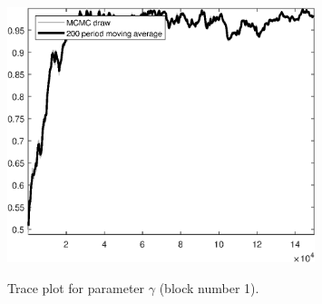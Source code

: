 \begin{figure}[H]
\centering
  \includegraphics[width=0.8\textwidth]{BRS_sectoral_wo_gmf/graphs/TracePlot_gam_blck_1}\\
    \caption{Trace plot for parameter $\gamma$ (block number 1).}
\end{figure}
